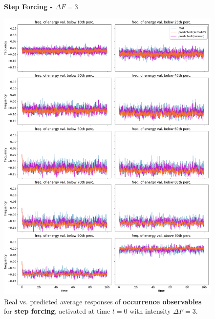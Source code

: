 \documentclass{article}
\begin{document}
\begin{figure}[!htb]
	\centering
	\textbf{Step Forcing - $\Delta F=3$}\par\medskip
	\includegraphics[width=0.9\linewidth]{fig/pred_below_S_30.png}
	\caption{Real vs. predicted average responses of \textbf{occurrence observables} for \textbf{step forcing}, activated at time $t=0$ with intensity $\Delta F = 3$.}
	\label{fig:pred_bin_S_30}
\end{figure}
\end{document}
